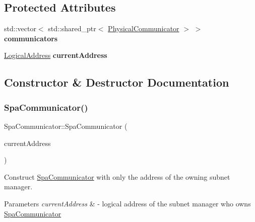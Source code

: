 \subsection*{Protected Attributes}
\begin{DoxyCompactItemize}
\item 
\mbox{\label{classSpaCommunicator_acafe7d632d63d55ea081f8a61647243a}} 
std\+::vector$<$ std\+::shared\+\_\+ptr$<$ \hyperlink{classPhysicalCommunicator}{Physical\+Communicator} $>$ $>$ {\bfseries communicators}
\item 
\mbox{\label{classSpaCommunicator_a6c00e876564bddf214695d067c20a1f4}} 
\hyperlink{structLogicalAddress}{Logical\+Address} {\bfseries current\+Address}
\end{DoxyCompactItemize}


\subsection{Constructor \& Destructor Documentation}
\mbox{\label{classSpaCommunicator_a4ed78daf6517b608f93dd894b65dab55}} 
\subsubsection{\texorpdfstring{Spa\+Communicator()}{SpaCommunicator()}}
{\footnotesize\ttfamily Spa\+Communicator\+::\+Spa\+Communicator (\begin{DoxyParamCaption}\item[{\hyperlink{structLogicalAddress}{Logical\+Address}}]{current\+Address }\end{DoxyParamCaption})}



Construct \hyperlink{classSpaCommunicator}{Spa\+Communicator} with only the address of the owning subnet manager. 


\begin{DoxyParams}{Parameters}
{\em current\+Address} & -\/ logical address of the subnet manager who owns \hyperlink{classSpaCommunicator}{Spa\+Communicator} \\
\hline
\end{DoxyParams}


